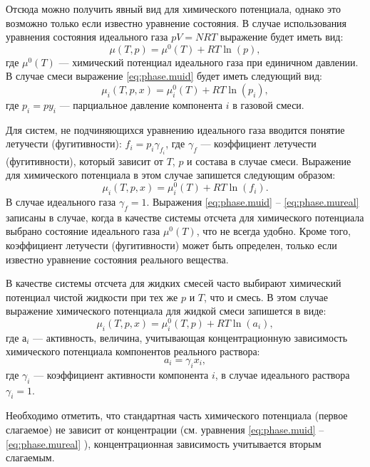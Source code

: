 Отсюда можно получить явный вид для химического потенциала, однако это возможно только если известно уравнение состояния. В случае использования уравнения состояния идеального газа $pV=NRT$ выражение будет иметь вид:
\begin{equation} \label{eq:phase.muid}
	\mu(T,p)=\mu^0(T)+RT \ln (p),
\end{equation}
где $\mu^0(T)$ --- химический потенциал идеального газа при единичном давлении. В случае смеси выражение \eqref{eq:phase.muid} будет иметь следующий вид:
\begin{equation} \label{eq:phase.muidi}
	\mu_i (T,p,x) = \mu_i^0(T) + RT \ln(p_i),
\end{equation}
где $p_i=p y_i$ --- парциальное давление компонента $i$ в газовой смеси.

Для систем, не подчиняющихся уравнению идеального газа вводится понятие летучести (фугитивности): $f_i=p_i \gamma_{f_i}$, где $\gamma_f$ --- коэффициент летучести (фугитивности), который зависит от $T$, $p$ и состава в случае смеси. Выражение для химического потенциала в этом случае запишется следующим образом:
\begin{equation} \label{eq:phase.mureal}
	\mu_i (T,p,x) = \mu_i^0(T) + RT \ln(f_i).
\end{equation}
В случае идеального газа $\gamma_f=1$.
Выражения \eqref{eq:phase.muid} -- \eqref{eq:phase.mureal}  записаны в случае, когда в качестве системы отсчета для химического потенциала выбрано состояние идеального газа $\mu^0(T)$, что не всегда удобно. Кроме того, коэффициент летучести (фугитивности) может быть определен, только если известно уравнение состояния реального вещества. 

В качестве системы отсчета для жидких смесей часто выбирают химический потенциал чистой жидкости  при тех же $p$ и $T$, что и смесь. В этом случае выражение химического потенциала для жидкой смеси запишется в виде:
\begin{equation}
	\mu_i(T,p,x)=\mu_i^0(T,p)+R T \ln (a_i),
\end{equation}
где $а_i$ --- активность, величина, учитывающая концентрационную зависимость химического потенциала компонентов реального раствора:
\begin{equation}
	a_i=\gamma_i x_i,
\end{equation}
где $\gamma_i$ --- коэффициент активности компонента $i$, в случае идеального раствора $\gamma_i =1 $.

Необходимо отметить, что стандартная часть химического потенциала (первое слагаемое) не зависит от концентрации (см. уравнения \eqref{eq:phase.muid} -- \eqref{eq:phase.mureal} ), концентрационная зависимость учитывается вторым слагаемым.

